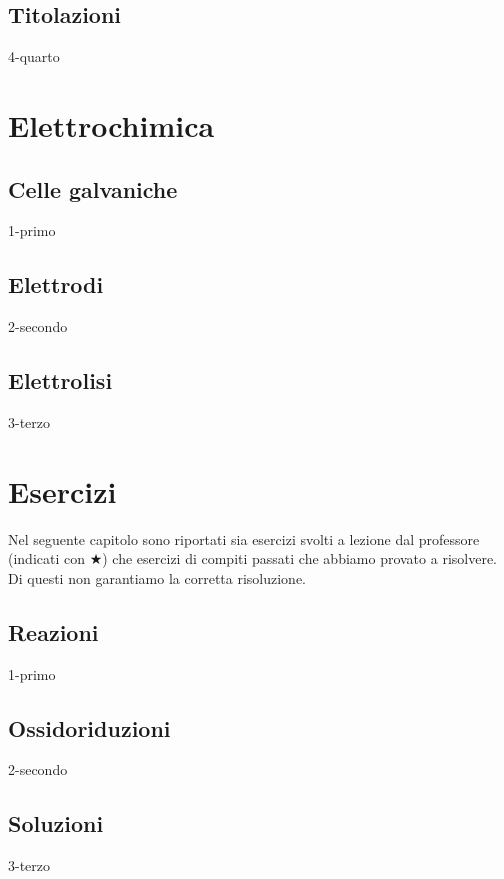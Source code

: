 \documentclass[openany,12pt]{book}%
\newcommand{\comment}[1]{}
\begin{document}
\section{Titolazioni}
{4-quarto}

\chapter{Elettrochimica}

\section{Celle galvaniche}
{1-primo}

\section{Elettrodi}
{2-secondo}

\section{Elettrolisi}
{3-terzo}

\appendix

\chapter{Esercizi}

Nel seguente capitolo sono riportati sia esercizi svolti a lezione dal professore (indicati con $\bigstar$) che esercizi di compiti passati che abbiamo provato a risolvere. Di questi non garantiamo la corretta risoluzione.

\section{Reazioni}
{1-primo}

\section{Ossidoriduzioni}
{2-secondo}

\section{Soluzioni}
{3-terzo}
\end{document}
